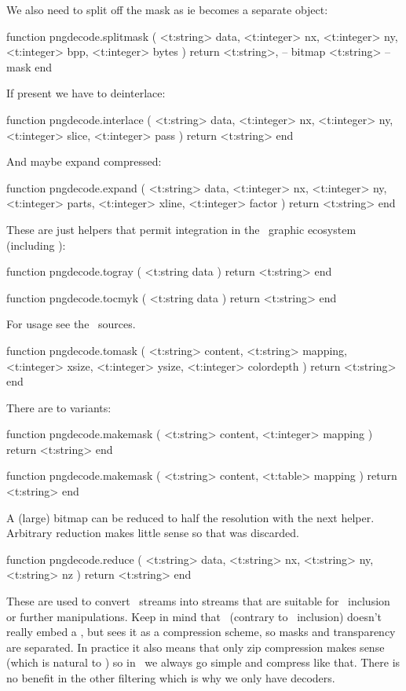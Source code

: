 We also need to split off the mask as ie becomes a separate object:

\starttyping[option=LUA]
function pngdecode.splitmask (
    <t:string>  data,
    <t:integer> nx,
    <t:integer> ny,
    <t:integer> bpp,
    <t:integer> bytes
)
    return
        <t:string>, -- bitmap
        <t:string>  -- mask
end
\stoptyping

If present we have to deinterlace:

\starttyping[option=LUA]
function pngdecode.interlace (
    <t:string>  data,
    <t:integer> nx,
    <t:integer> ny,
    <t:integer> slice,
    <t:integer> pass
)
    return <t:string>
end
\stoptyping

And maybe expand compressed:

\starttyping[option=LUA]
function pngdecode.expand (
    <t:string>  data,
    <t:integer> nx,
    <t:integer> ny,
    <t:integer> parts,
    <t:integer> xline,
    <t:integer> factor
)
    return <t:string>
end
\stoptyping

These are just helpers that permit integration in the \CONTEXT\ graphic
ecosystem (including \METAPOST):

\starttyping[option=LUA]
function pngdecode.togray ( <t:string data )
    return <t:string>
end

function pngdecode.tocmyk ( <t:string data )
    return <t:string>
end
\stoptyping

For usage see the \CONTEXT\ sources.

\starttyping[option=LUA]
function pngdecode.tomask (
    <t:string>  content,
    <t:string>  mapping,
    <t:integer> xsize,
    <t:integer> ysize,
    <t:integer> colordepth
)
    return <t:string>
end
\stoptyping

There are to variants:

\starttyping[option=LUA]
function pngdecode.makemask (
    <t:string>  content,
    <t:integer> mapping
)
    return <t:string>
end

function pngdecode.makemask (
    <t:string> content,
    <t:table>  mapping
)
    return <t:string>
end
\stoptyping

A (large) bitmap can be reduced to half the resolution with the next helper.
Arbitrary reduction makes little sense so that was discarded.

\starttyping[option=LUA]
function pngdecode.reduce (
    <t:string> data,
    <t:string> nx,
    <t:string> ny,
    <t:string> nz
)
    return <t:string>
end
\stoptyping

These are used to convert \PNG\ streams into streams that are suitable for \PDF\
inclusion or further manipulations. Keep in mind that \PDF\ (contrary to \JPEG\
inclusion) doesn't really embed a \PNG, but sees it as a compression scheme, so
masks and transparency are separated. In practice it also means that only zip
compression makes sense (which is natural to \PDF) so in \CONTEXT\ we always go
simple and compress like that. There is no benefit in the other filtering which
is why we only have decoders.

